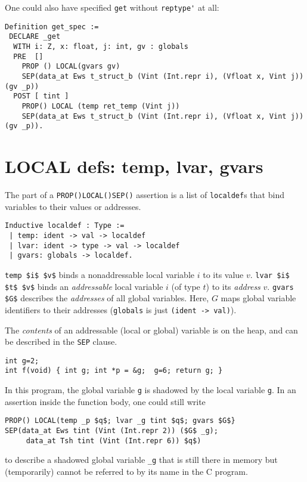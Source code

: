 \documentclass[12pt,fleqn,openany,oneside,showtrims]{memoir}
\begin{document}
One could also have specified \lstinline{get} without \lstinline{reptype'} at all:
\begin{lstlisting}
Definition get_spec :=
 DECLARE _get
  WITH i: Z, x: float, j: int, gv : globals
  PRE  []
    PROP () LOCAL(gvars gv)
    SEP(data_at Ews t_struct_b (Vint (Int.repr i), (Vfloat x, Vint j)) (gv _p))
  POST [ tint ]
    PROP() LOCAL (temp ret_temp (Vint j))
    SEP(data_at Ews t_struct_b (Vint (Int.repr i), (Vfloat x, Vint j)) (gv _p)).
\end{lstlisting}

\chapter{{\upshape LOCAL} defs: \upshape \sffamily temp, lvar, gvars}
\label{refcard:localdefs}
\label{refcard:gvar}

The \LOCAL{} part of a \lstinline{PROP()LOCAL()SEP()} assertion
is a list of \lstinline{localdef}s that
bind variables to their values or addresses.

\begin{lstlisting}
Inductive localdef : Type :=
 | temp: ident -> val -> localdef
 | lvar: ident -> type -> val -> localdef
 | gvars: globals -> localdef.
\end{lstlisting}
\lstinline{temp $i$ $v$} binds a nonaddressable local
variable $i$ to its value $v$.\newline
\lstinline{lvar $i$ $t$ $v$} binds an \emph{addressable} local
variable $i$ (of type $t$) to its \emph{address} $v$.\newline
\lstinline{gvars $G$} describes the \emph{addresses} of all global variables.
Here, $G$ maps global variable identifiers to their addresses (\lstinline{globals} is just \lstinline{(ident -> val)}).

The \emph{contents} of an addressable (local or global) variable
is on the heap, and can be described in the \lstinline{SEP} clause.

\begin{lstlisting}
int g=2;
int f(void) { int g; int *p = &g;  g=6; return g; }
\end{lstlisting}
In this program, the global variable \lstinline{g}
is shadowed by the local variable \lstinline{g}.
In an assertion inside the
function body, one could still write
\begin{lstlisting}
PROP() LOCAL(temp _p $q$; lvar _g tint $q$; gvars $G$}
SEP(data_at Ews tint (Vint (Int.repr 2)) ($G$ _g);
     data_at Tsh tint (Vint (Int.repr 6)) $q$)
\end{lstlisting}
to describe a shadowed global variable \lstinline{_g} that
is still there in memory but (temporarily) cannot be referred
to by its name in the C program.
\end{document}
